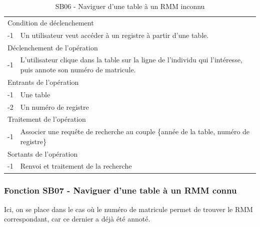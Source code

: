 \documentclass[a4paper]{article}
\begin{document}
\begin{table}[H]
  \centering
   \small
	\begin{tabular}{|c|p{12cm}|}
   		\hline
   			\rowcolor{lightgray}\multicolumn{2}{|c|}{\textbf{SB06 - Naviguer d'une table à un RMM inconnu}} \\
   		\hline
   			\multicolumn{2}{|l|}{Condition de d\'eclenchement} \\
   		\hline
   			-1 & Un utilisateur veut acc\'eder \`a un registre à partir d'une table. \\
   		\hline
   			\multicolumn{2}{|l|}{D\'eclenchement de l'op\'eration} \\
   		\hline
   			-1 & L'utilisateur clique dans la table sur la ligne de l'individu qui l'intéresse, puis annote son numéro de matricule. \\
   		\hline
   			\multicolumn{2}{|l|}{Entrants de l'op\'eration} \\
   		\hline
   			-1 & Une table \\
        			-2 & Un numéro de registre \\ 
   		\hline
   			\multicolumn{2}{|l|}{Traitement de l'op\'eration} \\
  		\hline
   			-1 & Associer une requête de recherche au couple \{année de la table, numéro de registre\} \\
   		\hline
   			\multicolumn{2}{|l|}{Sortants de l'op\'eration} \\
   		\hline
   			-1 & Renvoi et traitement de la recherche \\
   		\hline
	\end{tabular}
  \caption{SB06 - Naviguer d'une table à un RMM inconnu}
  \normalsize
  \label{tab:naviguer_table_registre_inconnu}
\end{table}



\subsubsection{Fonction SB07 - Naviguer d'une table à un RMM connu}

Ici, on se place dans le cas où le numéro de matricule permet de trouver le RMM correspondant, car ce dernier a déjà été annoté.
\end{document}
